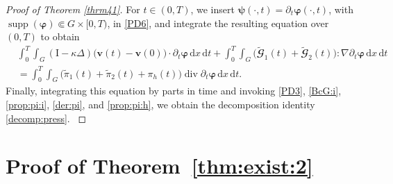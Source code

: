 \documentclass[12pt,reqno]{amsart}
\numberwithin{equation}{section}
\theoremstyle{definition}
\def\div{\operatorname{div}}
\def\supp{\operatorname{supp}}
\def\I{\mathrm{I}}
\def\vv{\boldsymbol{v}}
\def\bfi{\boldsymbol{\varphi}}
\def\bpsi{\boldsymbol{\psi}}
\def\bcG{\mathbfcal{G}}
\begin{document}
\begin{proof}[Proof of Theorem \ref{thrm41}]
{For $t \in (0,T)$, we insert $\bpsi(\cdot,t) = \partial_t \bfi(\cdot,t)$, with $\supp(\bfi) \Subset G \times [0,T)$, in \eqref{PD6}, and integrate the resulting equation over $(0,T)$ to obtain
\begin{equation*} %
\begin{split}
& \!\int_0^T\!\!\!\int_G (\I - \kappa \Delta) \big(\vv(t) - \vv(0)\big) \cdot \partial_t \bfi \, \mathrm{d}x \, \mathrm{d}t  + \!\int_0^T\!\!\!\int_G \big(\widetilde{\bcG}_1(t) + \widetilde{\bcG}_2(t)\big) : \nabla \partial_t \bfi \, \mathrm{d}x \, \mathrm{d}t
\\
&=
 \!\int_0^T\!\!\!\int_G \big(\widetilde{\pi}_1(t) + \widetilde{\pi}_2(t) + \pi_h(t)\big) \div\partial_t \bfi \, \mathrm{d}x \, \mathrm{d}t.
\end{split}
\end{equation*}
Finally, integrating this equation by parts in time and invoking \eqref{PD3}, \eqref{BcG:i}, \eqref{prop:pi:i}, \eqref{der:pi}, and
\eqref{prop:pi:h}, we obtain the decomposition identity \eqref{decomp:press}.
}
\end{proof}


\section{Proof of Theorem~\ref{thm:exist:2}}\label{Sect:ex:small}
\end{document}
